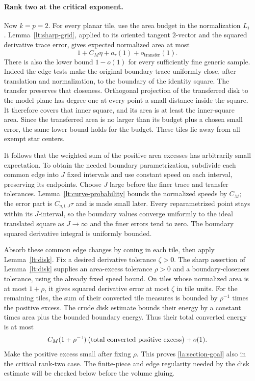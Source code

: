 \paragraph{Rank two at the critical exponent.}
Now $k=p=2$.  For every planar tile, use the area budget in the
normalization $L_i$.  Lemma~\ref{lt:sharp-grid}, applied to its
oriented tangent $2$-vector and the squared derivative trace error,
gives expected normalized area at most
\begin{equation}\label{la:sharp-area-budget}
 1+C_M\eta+o_\tau(1)+o_{\mathrm{transfer}}(1).
\end{equation}
There is also the lower bound $1-o(1)$ for every sufficiently fine
generic sample.  Indeed the edge tests make the original boundary
trace uniformly close, after translation and normalization, to the
boundary of the identity square.  The transfer preserves that
closeness.  Orthogonal projection of the transferred disk to the
model plane has degree one at every point a small distance inside
the square.  It therefore covers that inner square, and its area is
at least the inner-square area.  Since the transferred area is no
larger than its budget plus a chosen small error, the same lower
bound holds for the budget.  These tiles lie away from all exempt
star centers.

It follows that the weighted sum of the positive area excesses has
arbitrarily small expectation.  To obtain the needed boundary
parametrization, subdivide each common edge into $J$ fixed intervals
and use constant speed on each interval, preserving its endpoints.
Choose $J$ large before the finer trace and transfer tolerances.
Lemma~\ref{lt:curve-probability} bounds the normalized speeds by
$C_M$; the error part is $C_{\eta,l,J}\tau$ and is made small later.
Every reparametrized point stays within its $J$-interval, so the
boundary values converge uniformly to the ideal translated square
as $J\to\infty$ and the finer errors tend to zero.  The boundary
squared derivative integral is uniformly bounded.

Absorb these common edge changes by coning in each tile, then apply
Lemma~\ref{lt:disk}.  Fix a desired derivative tolerance $\zeta>0$.
The sharp assertion of Lemma~\ref{lt:disk} supplies an area-excess tolerance
$\rho>0$ and a boundary-closeness tolerance, using the already fixed
speed bound.  On tiles whose normalized area is at most $1+\rho$,
it gives squared derivative error at most $\zeta$ in tile units.
For the remaining tiles, the sum of their converted tile measures
is bounded by $\rho^{-1}$ times the positive excess.  The crude disk
estimate bounds their energy by a constant times area plus the
bounded boundary energy.  Thus their total converted energy is at
most
\[
 C_M(1+\rho^{-1})\,
       \bigl(\hbox{total converted positive excess}\bigr)
       +o(1).
\]
Make the positive excess small after fixing $\rho$.  This proves
\eqref{la:section-goal} also in the critical rank-two case.  The
finite-piece and edge regularity needed by the disk estimate will
be checked below before the volume gluing.

